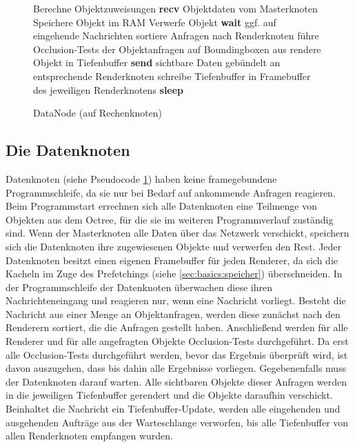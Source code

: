 \begin{figure}[ttt!]
\centering
 \begin{minipage}[t]{12cm}
\begin{algorithm}[H]
  \caption{DataNode (auf Rechenknoten)\label{alg:impl:datanode}} 
    \begin{algorithmic} [1]
      \STATE Berechne Objektzuweisungen
      \STATE \textbf{recv} Objektdaten vom Masterknoten
	\STATE Speichere Objekt im RAM
      \ELSE
	\STATE Verwerfe Objekt
      \ENDIF
	\STATE \textbf{wait} ggf. auf eingehende Nachrichten
	  \STATE sortiere Anfragen nach Renderknoten
	    \STATE führe Occlusion-Tests der Objektanfragen auf Boundingboxen aus
	  \ENDFOR
	    \STATE rendere Objekt in Tiefenbuffer
 	  \ENDFOR
	  \STATE \textbf{send} sichtbare Daten gebündelt an entsprechende Renderknoten
	  \STATE schreibe Tiefenbuffer in Framebuffer des jeweiligen Renderknotens
	\ELSE \STATE\textbf{sleep}
	\ENDIF
      \ENDWHILE
    \end{algorithmic}
\end{algorithm}
 \end{minipage}
\end{figure}

\subsection{Die Datenknoten}
\label{sec:impl:daten}
Datenknoten (siehe Pseudocode \ref{alg:impl:datanode}) haben keine framegebundene Programmschleife, da sie nur bei Bedarf auf ankommende Anfragen reagieren. Beim Programmstart errechnen sich alle Datenknoten eine Teilmenge von Objekten aus dem Octree, für die sie im weiteren Programmverlauf zuständig sind. Wenn der Masterknoten alle Daten über das Netzwerk verschickt, speichern sich die Datenknoten ihre zugewiesenen Objekte und verwerfen den Rest. Jeder Datenknoten besitzt einen eigenen Framebuffer für jeden Renderer, da sich die Kacheln im Zuge des Prefetchings (siehe \ref{sec:basics:speicher}) überschneiden. In der Programmschleife der Datenknoten überwachen diese ihren Nachrichteneingang und reagieren nur, wenn eine Nachricht vorliegt. Besteht die Nachricht aus einer Menge an Objektanfragen, werden diese zunächst nach den Renderern sortiert, die die Anfragen gestellt haben. Anschließend werden für alle Renderer und für alle angefragten Objekte Occlusion-Tests durchgeführt. Da erst alle Occlusion-Tests durchgeführt werden, bevor das Ergebnis überprüft wird, ist davon auszugehen, dass bis dahin alle Ergebnisse vorliegen. Gegebenenfalls muss der Datenknoten darauf warten. Alle sichtbaren Objekte dieser Anfragen werden in die jeweiligen Tiefenbuffer gerendert und die Objekte daraufhin verschickt. Beinhaltet die Nachricht ein Tiefenbuffer-Update, werden alle eingehenden und ausgehenden Aufträge aus der Warteschlange verworfen, bis alle Tiefenbuffer von allen Renderknoten empfangen wurden.

